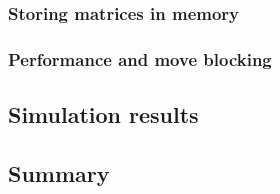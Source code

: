 \subsubsection{Storing matrices in memory}

\subsubsection{Performance and move blocking}
\label{cap:implementation_performance}

\subsection{Simulation results}

\subsection{Summary}